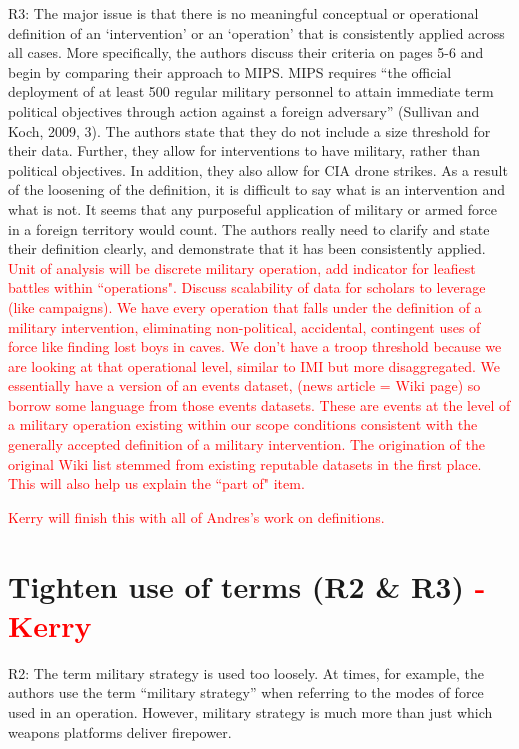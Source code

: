 \documentclass[fleqn,12pt]{article}
\begin{document}
\noindent
R3: The major issue is that there is no meaningful conceptual or operational definition of an ‘intervention’ or an ‘operation’ that is consistently applied across all cases. More specifically, the authors discuss their criteria on pages 5-6 and begin by comparing their approach to MIPS. MIPS requires “the official deployment of at least 500 regular military personnel to attain immediate term political objectives through action against a foreign adversary” (Sullivan and Koch, 2009, 3). The authors state that they do not include a size threshold for their data. Further, they allow for interventions to have military, rather than political objectives. In addition, they also allow for CIA drone strikes. As a result of the loosening of the definition, it is difficult to say what is an intervention and what is not. It seems that any purposeful application of military or armed force in a foreign territory would count. The authors really need to clarify and state their definition clearly, and demonstrate that it has been consistently applied. \\

\textcolor{red}{Unit of analysis will be discrete military operation, add indicator for leafiest battles within ``operations". Discuss scalability of data for scholars to leverage (like campaigns). We have every operation that falls under the definition of a military intervention, eliminating non-political, accidental, contingent uses of force like finding lost boys in caves. We don't have a troop threshold because we are looking at that operational level, similar to IMI but more disaggregated. We essentially have a version of an events dataset, (news article = Wiki page) so borrow some language from those events datasets. These are events at the level of a military operation existing within our scope conditions consistent with the generally accepted definition of a military intervention. The origination of the original Wiki list stemmed from existing reputable datasets in the first place. This will also help us explain the ``part of" item.}

\textcolor{red}{Kerry will finish this with all of Andres's work on definitions.}

\section{Tighten use of terms (R2 \& R3) \textcolor{red}{- Kerry}}
R2: The term military strategy is used too loosely. At times, for example, the authors use the term “military strategy” when referring to the modes of force used in an operation. However, military strategy is much more than just which weapons platforms deliver firepower. \\
\end{document}
